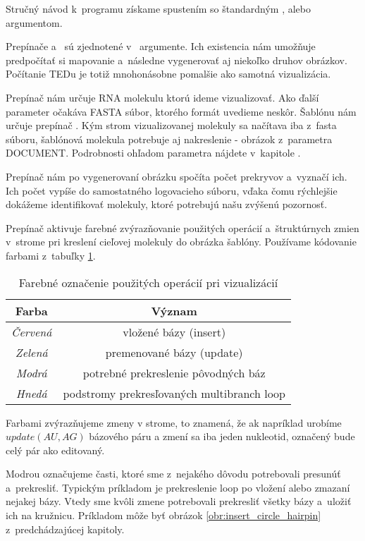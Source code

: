 Stručný návod k~programu získame spustením so štandardným
, alebo  argumentom.

Prepínače  a~ sú zjednotené v~ argumente.
Ich existencia nám umožňuje predpočítať si mapovanie a~následne vygenerovať
aj niekoľko druhov obrázkov. Počítanie TEDu je totiž mnohonásobne
pomalšie ako samotná vizualizácia.

Prepínač  nám určuje RNA molekulu ktorú ideme vizualizovať.
Ako ďalší parameter očakáva FASTA súbor, ktorého formát uvedieme neskôr.
Šablónu nám určuje prepínač .
Kým strom vizualizovanej molekuly sa načítava iba z~fasta súboru,
šablónová molekula potrebuje aj nakreslenie - obrázok z~parametra DOCUMENT.
Podrobnosti ohľadom parametra  nájdete v~kapitole .

Prepínač  nám po vygenerovaní obrázku spočíta počet prekryvov
a~vyznačí ich. Ich počet vypíše do samostatného logovacieho súboru, vďaka čomu
rýchlejšie dokážeme identifikovať molekuly, ktoré potrebujú našu zvýšenú
pozornosť.

Prepínač  aktivuje farebné zvýrazňovanie použitých operácií
a~\mbox{štruktúrnych} zmien v~strome pri kreslení cieľovej molekuly do obrázka
šablóny. Používame kódovanie farbami z~tabuľky \ref{tab:color_coding}.

\begin{table}
  \centering
  \begin{tabular}{c|c}
    Farba & Význam \\
    \toprule
    \textit{Červená} & vložené bázy (insert) \\
    \midrule
    \textit{Zelená} & premenované bázy (update) \\
    \midrule
    \textit{Modrá} & potrebné prekreslenie pôvodných báz \\
    \midrule
    \textit{Hnedá} & podstromy prekresľovaných multibranch loop \\
    \bottomrule
  \end{tabular}
  \caption{Farebné označenie použitých operácií pri vizualizácií}
  \label{tab:color_coding}
\end{table}

Farbami zvýrazňujeme zmeny v strome, to znamená, že ak napríklad
urobíme $update(AU, AG)$ bázového páru a zmení sa iba jeden nukleotid,
označený bude celý pár ako editovaný.

Modrou označujeme časti, ktoré sme z~nejakého dôvodu potrebovali presunúť a~prekresliť.
Typickým príkladom je prekreslenie loop po vložení alebo zmazaní nejakej bázy.
Vtedy sme kvôli zmene potrebovali prekresliť všetky bázy a~uložiť ich na kružnicu.
Príkladom môže byť obrázok \ref{obr:insert_circle_hairpin} z~predchádzajúcej kapitoly.

